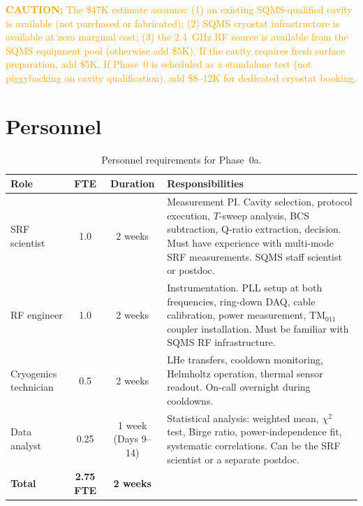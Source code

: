 \documentclass[11pt]{article}
\newcommand{\caution}[1]{\textcolor{orange}{\textbf{CAUTION:} #1}}
\theoremstyle{definition}
\theoremstyle{remark}
\begin{document}
\caution{The \$47K estimate assumes: (1) an existing SQMS-qualified
cavity is available (not purchased or fabricated); (2) SQMS
cryostat infrastructure is available at zero marginal cost;
(3) the 2.4~GHz RF source is available from the SQMS equipment
pool (otherwise add \$5K). If the cavity requires fresh surface
preparation, add \$5K. If Phase~0 is scheduled as a standalone
test (not piggybacking on cavity qualification), add \$8--12K for
dedicated cryostat booking.}


\part{Personnel}
\label{sec:personnel}


\begin{table}[H]
\centering
\caption{Personnel requirements for Phase~0a.}
\label{tab:personnel}
\renewcommand{\arraystretch}{1.3}
\begin{tabular}{@{}lccp{5.5cm}@{}}
\toprule
\textbf{Role} & \textbf{FTE} & \textbf{Duration}
& \textbf{Responsibilities} \\
\midrule

SRF scientist & 1.0 & 2 weeks
& Measurement PI. Cavity selection, protocol execution, $T$-sweep
analysis, BCS subtraction, Q-ratio extraction, decision. Must have
experience with multi-mode SRF measurements. SQMS staff scientist
or postdoc. \\

RF engineer & 1.0 & 2 weeks
& Instrumentation. PLL setup at both frequencies, ring-down DAQ,
cable calibration, power measurement, TM$_{011}$ coupler installation.
Must be familiar with SQMS RF infrastructure. \\

Cryogenics technician & 0.5 & 2 weeks
& LHe transfers, cooldown monitoring, Helmholtz operation, thermal
sensor readout. On-call overnight during cooldowns. \\

Data analyst & 0.25 & 1 week (Days 9--14)
& Statistical analysis: weighted mean, $\chi^2$ test, Birge ratio,
power-independence fit, systematic correlations. Can be the SRF
scientist or a separate postdoc. \\

\midrule
\textbf{Total} & \textbf{2.75 FTE} & \textbf{2 weeks} & \\
\bottomrule
\end{tabular}
\end{table}
\end{document}
